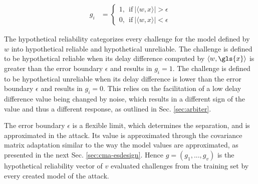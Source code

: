 \begin{equation}
\begin{aligned}
g_i &=
\begin{cases}
1,\ \ \text{if}\ |\langle w, x \rangle| > \epsilon\\
0,\ \ \text{if}\ |\langle w, x \rangle| < \epsilon \label{equ:hypotheticalreliability}
\end{cases}
\end{aligned}
\end{equation}

The hypothetical reliability categorizes every challenge for the model defined by $w$ into hypothetical reliable and hypothetical unreliable. %
The challenge is defined to be hypothetical reliable when its delay difference computed by $\langle w, \gls{x} \rangle$ is greater than the error boundary $\epsilon$ and results in $g_i = 1$.
The challenge is defined to be hypothetical unreliable when its delay difference is lower than the error boundary $\epsilon$ and results in $g_i = 0$. %
This relies on the facilitation of a low delay difference value being changed by noise, which results in a different sign of the value and thus a different response, as outlined in Sec. \ref{sec:arbiter}. 

The error boundary $\epsilon$ is a flexible limit, which determines the separation, and is approximated in the attack.
Its value is approximated through the covariance matrix adaptation similar to the way the model values are approximated, as presented in the next Sec. \ref{sec:cma-esdesign}.
Hence $g = (g_1, ..., g_v)$ is the hypothetical reliability vector of $v$ evaluated challenges from the training set by every created model of the attack.

